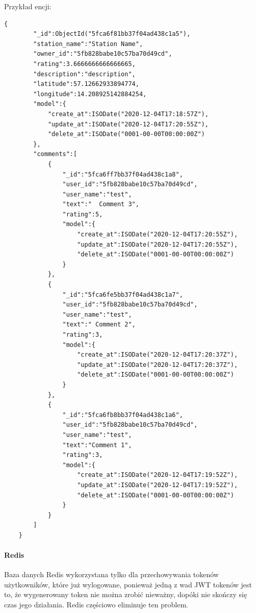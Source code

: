 Przykład encji:
\begin{lstlisting}[basicstyle=\tiny\ttfamily]
    {
        "_id":ObjectId("5fca6f81bb37f04ad438c1a5"),
        "station_name":"Station Name",
        "owner_id":"5fb828babe10c57ba70d49cd",
        "rating":3.6666666666666665,
        "description":"description",
        "latitude":57.12662933894774,
        "longitude":14.208925142884254,
        "model":{
            "create_at":ISODate("2020-12-04T17:18:57Z"),
            "update_at":ISODate("2020-12-04T17:20:55Z"),
            "delete_at":ISODate("0001-00-00T00:00:00Z")
        },
        "comments":[
            {
                "_id":"5fca6ff7bb37f04ad438c1a8",
                "user_id":"5fb828babe10c57ba70d49cd",
                "user_name":"test",
                "text":"  Comment 3",
                "rating":5,
                "model":{
                    "create_at":ISODate("2020-12-04T17:20:55Z"),
                    "update_at":ISODate("2020-12-04T17:20:55Z"),
                    "delete_at":ISODate("0001-00-00T00:00:00Z")
                }
            },
            {
                "_id":"5fca6fe5bb37f04ad438c1a7",
                "user_id":"5fb828babe10c57ba70d49cd",
                "user_name":"test",
                "text":" Comment 2",
                "rating":3,
                "model":{
                    "create_at":ISODate("2020-12-04T17:20:37Z"),
                    "update_at":ISODate("2020-12-04T17:20:37Z"),
                    "delete_at":ISODate("0001-00-00T00:00:00Z")
                }
            },
            {
                "_id":"5fca6fb8bb37f04ad438c1a6",
                "user_id":"5fb828babe10c57ba70d49cd",
                "user_name":"test",
                "text":"Comment 1",
                "rating":3,
                "model":{
                    "create_at":ISODate("2020-12-04T17:19:52Z"),
                    "update_at":ISODate("2020-12-04T17:19:52Z"),
                    "delete_at":ISODate("0001-00-00T00:00:00Z")
                }
            }
        ]
    }
\end{lstlisting}

% 
\paragraph{Redis\newline}
Baza danych Redis wykorzystana tylko dla przechowywania tokenów użytkowników, które już wylogowane, ponieważ jedną z wad JWT tokenów jest to, że wygenerowany token nie można zrobić nieważny, dopóki nie skończy się czas jego działania.
Redis częściowo eliminuje ten problem.

